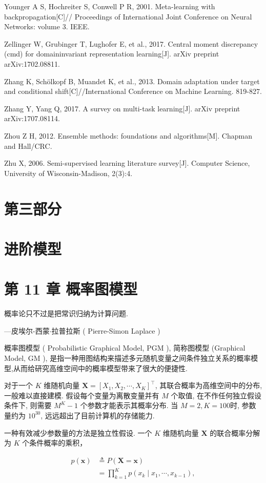 \documentclass[10pt]{article}
\begin{document}
Younger A S, Hochreiter S, Conwell P R, 2001. Meta-learning with backpropagation[C]// Proceedings of International Joint Conference on Neural Networks: volume 3. IEEE.

Zellinger W, Grubinger T, Lughofer E, et al., 2017. Central moment discrepancy (cmd) for domaininvariant representation learning[J]. arXiv preprint arXiv:1702.08811.

Zhang K, Schölkopf B, Muandet K, et al., 2013. Domain adaptation under target and conditional shift[C]//International Conference on Machine Learning. 819-827.

Zhang Y, Yang Q, 2017. A survey on multi-task learning[J]. arXiv preprint arXiv:1707.08114.

Zhou Z H, 2012. Ensemble methods: foundations and algorithms[M]. Chapman and Hall/CRC.

Zhu X, 2006. Semi-supervised learning literature survey[J]. Computer Science, University of Wisconsin-Madison, 2(3):4.

\section*{第三部分}
\section*{进阶模型}
\section*{第 11 章 概率图模型}
概率论只不过是把常识归纳为计算问题.

—皮埃尔-西蒙$\cdot$拉普拉斯 ( Pierre-Simon Laplace )

概率图模型 ( Probabilistic Graphical Model, PGM ), 简称图模型 (Graphical Model, GM ), 是指一种用图结构来描述多元随机变量之间条件独立关系的概率模型,从而给研究高维空间中的概率模型带来了很大的便捷性.

对于一个 $K$ 维随机向量 $\boldsymbol{X}=\left[X_{1}, X_{2}, \cdots, X_{K}\right]^{\top}$, 其联合概率为高维空间中的分布, 一般难以直接建模. 假设每个变量为离散变量并有 $M$ 个取值, 在不作任何独立假设条件下, 则需要 $M^{K}-1$ 个参数才能表示其概率分布. 当 $M=2, K=100$时, 参数量约为 $10^{30}$, 远远超出了目前计算机的存储能力.

一种有效减少参数量的方法是独立性假设. 一个 $K$ 维随机向量 $\boldsymbol{X}$ 的联合概率分解为 $K$ 个条件概率的乘积，


\begin{align*}
p(\boldsymbol{x}) & \triangleq P(\boldsymbol{X}=\boldsymbol{x})  \tag{11.1}\\
& =\prod_{k=1}^{K} p\left(x_{k} \mid x_{1}, \cdots, x_{k-1}\right), \tag{11.2}
\end{align*}
\end{document}
